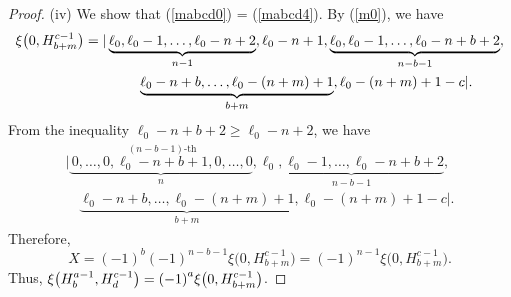\documentclass[10pt,a4paper]{amsart}
\numberwithin{equation}{section}
\begin{document}
\begin{proof}
(iv) We show that (\ref{mabcd0}) = (\ref{mabcd4}). By (\ref{m0}), we have
\begin{gather*}
\xi\bigl(0,H^{c-1}_{b+m}\bigr)=|\underbrace{\ell_{0},\ell_{0}-1,\dots,\ell_{0}-n+2}_{n-1}, {\ell_{0}-n+1},
\underbrace{\ell_{0},\ell_{0}-1,\dots,\ell_{0}-n+b+2}_{n-b-1},\\
\hphantom{\xi\bigl(0,H^{c-1}_{b+m}\bigr)=|}{}
\underbrace{\ell_{0}-n+b,\dots,\ell_{0}-(n+m)+1}_{b+m},\ell_{0}-(n+m)+1-c|\nonumber.
\end{gather*}
From the inequality $\ell_{0}-n+b+2\geq \ell_0-n+2$, we have
\begin{gather*}
|\underbrace{\,0,\dots,0,\stackrel{(n-b-1)\text{-th}}{\ell_{0}-n+b+1},0,\dots,0}_{n},\underbrace{\ell_{0},\ell_{0}-1,\dots,\ell_{0}-n+b+2}_{n-b-1},\\
\quad{}
\underbrace{\ell_{0}-n+b,\dots,\ell_{0}-(n+m)+1}_{b+m},\ell_{0}-(n+m)+1-c|\nonumber.
\end{gather*}
Therefore,
\[
X={(-1)}^{b}{(-1)}^{n-b-1}\xi\bigl(0,H^{c-1}_{b+m}\bigr)={(-1)}^{n-1}\xi\bigl(0,H^{c-1}_{b+m}\bigr).
\]
 Thus, $\xi\smash{\bigl(H^{a-1}_{b},H^{c-1}_{d}\bigr)}={(-1)}^{a}\xi\smash{\bigl(0,H^{c-1}_{b+m}\bigr)}$.
\end{proof}
\end{document}
